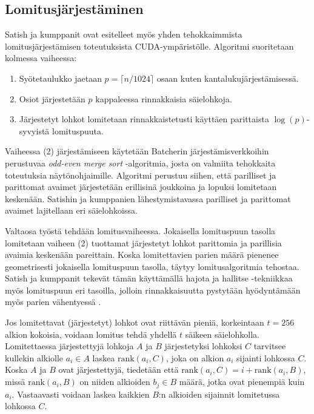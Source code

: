 \documentclass[a4paper,11pt]{article}
\newcommand{\engl}[1]{\foreignlanguage{english}{\em #1}}
\begin{document}
\subsection{Lomitusjärjestäminen}

Satish ja kumppanit \cite{satish2009} ovat esitelleet myös yhden tehokkaimmista lomitusjärjestämisen toteutuksista CUDA-ympäristölle. Algoritmi suoritetaan kolmessa vaiheessa:

\begin{singlespace*}
\begin{enumerate}
\item Syötetaulukko jaetaan $p = \lceil n/1024 \rceil$ osaan kuten kantalukujärjestämisessä.
\item Osiot järjestetään $p$ kappaleessa rinnakkaisia säielohkoja.
\item Järjestetyt lohkot lomitetaan rinnakkaistetusti käyttäen parittaista $\log(p)$-syvyistä lomituspuuta.
\end{enumerate}
\end{singlespace*}

Vaiheessa (2) järjestämiseen käytetään Batcherin järjestämisverkkoihin perustuvaa \engl{odd-even merge sort} -algoritmia, josta on valmiita tehokkaita toteutuksia näytönohjaimille. Algoritmi perustuu siihen, että parilliset ja parittomat avaimet järjestetään erillisinä joukkoina ja lopuksi lomitetaan keskenään. Satishin ja kumppanien lähestymistavassa parilliset ja parittomat avaimet lajitellaan eri säielohkoissa.

Valtaosa työstä tehdään lomitusvaiheessa. Jokaisella lomituspuun tasolla lomitetaan vaiheen (2) tuottamat järjestetyt lohkot parittomia ja parillisia avaimia keskenään pareittain. Koska lomitettavien parien määrä pienenee geometrisesti jokaisella lomituspuun tasolla, täytyy lomitusalgoritmia tehostaa. Satish ja kumppanit tekevät tämän käyttämällä hajota ja hallitse -tekniikkaa myös lomituspuun eri tasoilla, jolloin rinnakkaisuutta pystytään hyödyntämään myös parien vähentyessä \cite{satish2009}.

Jos lomitettavat (järjestetyt) lohkot ovat riittävän pieniä, korkeintaan $t = 256$ alkion kokoisia, voidaan lomitus tehdä yhdellä $t$ säikeen säielohkolla. Lomitettaessa järjestettyjä lohkoja $A$ ja $B$ järjestetyksi lohkoksi $C$ tarvitsee kullekin alkiolle $a_i \in A$ laskea $\mathrm{rank}(a_i, C)$, joka on alkion $a_i$ sijainti lohkossa $C$. Koska $A$ ja $B$ ovat järjestettyjä, tiedetään että $\mathrm{rank}(a_i, C) = i + \mathrm{rank}(a_i, B)$, missä $\mathrm{rank}(a_i, B)$ on niiden alkioiden $b_j \in B$ määrä, jotka ovat pienempiä kuin $a_i$. Vastaavasti voidaan laskea kaikkien $B$:n alkioiden sijainnit lomitetussa lohkossa $C$.
\end{document}
